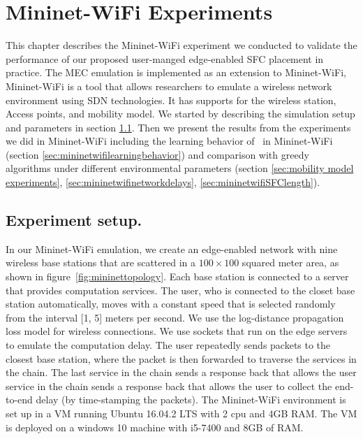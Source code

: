 \chapter{\textbf{Mininet-WiFi Experiments}}
\label{chapter: Mininet-wifi Experiments}
This chapter describes the Mininet-WiFi experiment we conducted to validate the performance of our proposed user-manged edge-enabled SFC placement in practice. The MEC emulation is implemented as an extension to Mininet-WiFi\cite{mininetwifi}, Mininet-WiFi is a tool that allows researchers to emulate a wireless network environment using SDN technologies. It has supports for the wireless station, Access points, and mobility model. We started by describing the simulation setup and parameters in section \ref{sec:mininetwifisetup}. Then we present the results from the experiments we did in Mininet-WiFi including the learning behavior of \myalgorithm\ in Mininet-WiFi (section \ref{sec:mininetwifilearningbehavior}) and comparison with greedy algorithms under different environmental parameters (section \ref{sec:mobility model experiments}, \ref{sec:mininetwifinetworkdelays}, \ref{sec:mininetwifiSFClength}). 




\section{Experiment setup.}
\label{sec:mininetwifisetup}
In our Mininet-WiFi emulation, we create an edge-enabled network with nine wireless base stations that are scattered in a $100\times100$ squared meter area, as shown in figure~\ref{fig:mininettopology}. Each base station is connected to a server that provides computation services. The user, who is connected to the closet base station automatically,  moves with a constant speed that is selected randomly from the interval [1, 5] meters per second. We use the log-distance propagation loss model for wireless connections. We use sockets that run on the edge servers to emulate the computation delay. The user repeatedly sends packets to the closest base station, where the packet is then forwarded to traverse the services in the chain. The last service in the chain sends a response back that allows the user service in the chain sends a response back that allows the user to collect the end-to-end delay (by time-stamping the packets).
The Mininet-WiFi environment is set up in a VM running Ubuntu 16.04.2 LTS with 2 cpu and 4GB RAM. The VM is deployed on a windows 10 machine with i5-7400 and 8GB of RAM.


